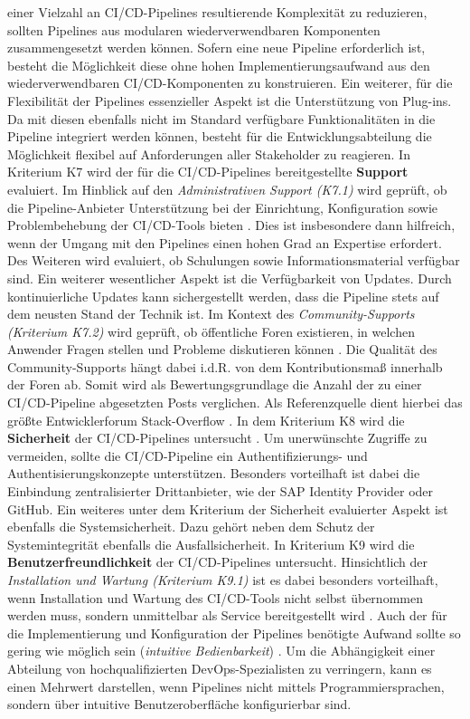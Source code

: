 einer Vielzahl an CI/CD-Pipelines resultierende Komplexität zu reduzieren, sollten Pipelines aus modularen wiederverwendbaren Komponenten zusammengesetzt werden können. Sofern eine neue Pipeline erforderlich ist, besteht die Möglichkeit diese ohne hohen Implementierungsaufwand aus den wiederverwendbaren CI/CD-Komponenten zu konstruieren. Ein weiterer, für die Flexibilität der Pipelines essenzieller Aspekt ist die Unterstützung von Plug-ins. Da mit diesen ebenfalls nicht im Standard verfügbare Funktionalitäten in die Pipeline integriert werden können, besteht für die Entwicklungsabteilung die Möglichkeit flexibel auf Anforderungen aller Stakeholder zu reagieren. In Kriterium K7 wird der für die CI/CD-Pipelines bereitgestellte \textbf{Support} evaluiert. Im Hinblick auf den \textit{Administrativen Support (K7.1)} wird geprüft, ob die Pipeline-Anbieter Unterstützung bei der Einrichtung, Konfiguration sowie Problembehebung der CI/CD-Tools bieten \cite[Z. 44 ff.]{ProductManagerSAPHyperspaceCICD.}. Dies ist insbesondere dann hilfreich, wenn der Umgang mit den Pipelines einen hohen Grad an Expertise erfordert. Des Weiteren wird evaluiert, ob Schulungen sowie Informationsmaterial verfügbar sind. Ein weiterer wesentlicher Aspekt ist die Verfügbarkeit von Updates. Durch kontinuierliche Updates kann sichergestellt werden, dass die Pipeline stets auf dem neusten Stand der Technik ist. Im Kontext des \textit{Community-Supports (Kriterium K7.2)} wird geprüft, ob öffentliche Foren existieren, in welchen Anwender Fragen stellen und Probleme diskutieren können \cite[Z. 45 ff.]{ProductManagerSAPHyperspaceCICD.}. Die Qualität des Community-Supports hängt dabei i.d.R. von dem Kontributionsmaß innerhalb der Foren ab. Somit wird als Bewertungsgrundlage die Anzahl der zu einer CI/CD-Pipeline abgesetzten Posts verglichen. Als Referenzquelle dient hierbei das größte Entwicklerforum Stack-Overflow \cite{StackOverflow.20230403}. In dem Kriterium K8 wird die \textbf{Sicherheit} der CI/CD-Pipelines untersucht \cite[Z. 75 ff.]{ProductOwnerSAPBTPProd&Infra.}. Um unerwünschte Zugriffe zu vermeiden, sollte die CI/CD-Pipeline ein Authentifizierungs- und Authentisierungskonzepte unterstützen. Besonders vorteilhaft ist dabei die Einbindung zentralisierter Drittanbieter, wie der SAP Identity Provider oder GitHub. Ein weiteres unter dem Kriterium der Sicherheit evaluierter Aspekt ist ebenfalls die Systemsicherheit. Dazu gehört neben dem Schutz der Systemintegrität ebenfalls die Ausfallsicherheit. In Kriterium K9 wird die \textbf{Benutzerfreundlichkeit} der CI/CD-Pipelines untersucht. Hinsichtlich der \textit{Installation und Wartung (Kriterium K9.1)} ist es dabei besonders vorteilhaft, wenn Installation und Wartung des CI/CD-Tools nicht selbst übernommen werden muss, sondern unmittelbar als Service bereitgestellt wird \cite[Z. 65 ff.]{ProductOwnerSAPBTPProd&Infra.}. Auch der für die Implementierung und Konfiguration der Pipelines benötigte Aufwand sollte so gering wie möglich sein (\textit{intuitive Bedienbarkeit}) \cite[Z. 65 ff.]{ProductOwnerSAPBTPProd&Infra.}. Um die Abhängigkeit einer Abteilung von hochqualifizierten DevOps-Spezialisten zu verringern, kann es
einen Mehrwert darstellen, wenn Pipelines nicht mittels Programmiersprachen, sondern über intuitive Benutzeroberfläche konfigurierbar sind. 
